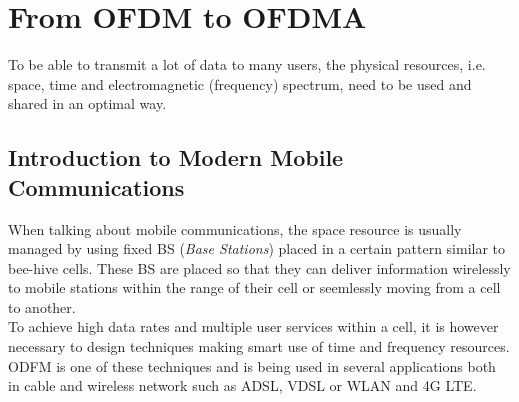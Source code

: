 \chapter{From OFDM to OFDMA}
\indent To be able to transmit a lot of data to many users, the physical resources, i.e. space, time and electromagnetic (frequency) spectrum, need to be used and shared in an optimal way.\\
%
\section{Introduction to Modern Mobile Communications}
\indent When talking about mobile communications, the space  resource is usually managed by using fixed BS (\textit{Base Stations}) placed in a certain pattern similar to bee-hive cells. These BS are placed so that they can deliver information wirelessly to mobile stations within the range of their cell or seemlessly moving from a cell to another.\\
%
\indent To achieve high data rates and multiple user services within a cell, it is however necessary to design techniques making smart use of time and frequency resources. ODFM is one of these techniques and is being used in several applications both in cable and wireless network such as ADSL, VDSL or WLAN and 4G LTE.